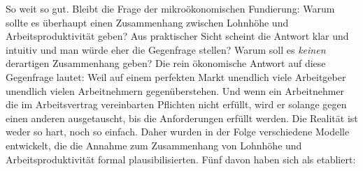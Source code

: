 So weit so gut. Bleibt die Frage der mikroökonomischen Fundierung: Warum sollte es überhaupt einen Zusammenhang zwischen Lohnhöhe und Arbeitsproduktivität geben? Aus praktischer Sicht scheint die Antwort klar und intuitiv und man würde eher die Gegenfrage stellen? Warum soll es \textit{keinen} derartigen Zusammenhang geben? Die rein ökonomische Antwort auf diese Gegenfrage lautet: Weil auf einem perfekten Markt unendlich viele Arbeitgeber unendlich vielen Arbeitnehmern gegenüberstehen. Und wenn ein Arbeitnehmer die im Arbeitsvertrag vereinbarten Pflichten nicht erfüllt, wird er solange gegen einen anderen ausgetauscht, bis die Anforderungen erfüllt werden. Die Realität ist weder so hart, noch so einfach. Daher wurden in der Folge verschiedene Modelle \parencite{Yellen1984} entwickelt, die die Annahme zum Zusammenhang von Lohnhöhe und Arbeitsproduktivität formal plausibilisierten. Fünf davon haben sich als etabliert: 

